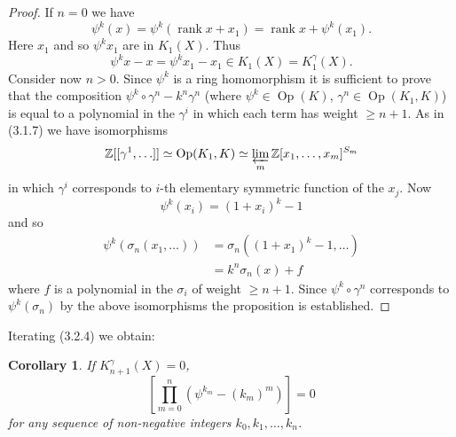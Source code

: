 \documentclass[leqno]{book}
\numberwithin{equation}{section}
\newtheorem{corollary}[theorem]{Corollary}
\theoremstyle{definition}
\begin{document}
            \begin{proof}
              If $n=0$ we have
              \begin{equation*}
                \psi^{k}(x)=\psi^{k}(\operatorname{rank}x+x_1)=\operatorname{rank}x + \psi^{k}(x_1).
              \end{equation*}
              Here $x_1$ and so $\psi^{k}x_1$ are in $K_1(X)$. Thus
              \begin{equation*}
                \psi^{k}x-x=\psi^{k}x_1-x_1 \in K_1(X)=K^{\gamma}_{1}(X).
              \end{equation*}
              Consider now $n>0$. Since $\psi^{k}$ is a ring homomorphism it is sufficient to prove that the composition $\psi^{k}\circ \gamma^{n}-k^{n}\gamma^{n}$ (where $\psi^{k}\in \operatorname{Op}(K)$, $\gamma^{n} \in \operatorname{Op}(K_1,K)$) is equal to a polynomial in the $\gamma^{i}$ in which each term has weight $\ge n+1$. As in (3.1.7) we have isomorphisms
              \begin{equation*}
                \mathbb{Z}[[\gamma^{1}, \ldots ]] \simeq \operatorname{Op}(K_1,K) \simeq \varprojlim _{m} \mathbb{Z}[x_1, \ldots ,x_{m}]^{S_{m}}
              \end{equation*}
              in which $\gamma^{i}$ corresponds to $i$-th elementary symmetric function of the $x_{j}$. Now
              \begin{equation*}
                \psi^{k}(x_i)=(1+x_{i})^{k}-1
              \end{equation*}
              and so 
              \begin{equation*}
                \begin{aligned}
                  \psi^{k}(\sigma_{n}(x_1, \ldots ))&=\sigma_{n}((1+x_1)^{k}-1, \ldots ) \\
                  &= k^{n}\sigma_{n}(x)+f
                \end{aligned}
              \end{equation*}
              where $f$ is a polynomial in the $\sigma_{i}$ of weight $\ge n+1$. Since $\psi^{k}\circ \gamma^{n}$ corresponds to $\psi^{k}(\sigma_{n})$ by the above isomorphisms the proposition is established.
            \end{proof}

            Iterating (3.2.4) we obtain:

            \begin{corollary}
              If $K^{\gamma}_{n+1}(X)=0$,
              \begin{equation*}
                \left[\prod_{m=0}^{n} (\psi^{k_{m}}-(k_{m})^{m})\right]=0
              \end{equation*}
              for any sequence of non-negative integers $k_0,k_1, \ldots ,k_{n}$.
            \end{corollary}
\end{document}
